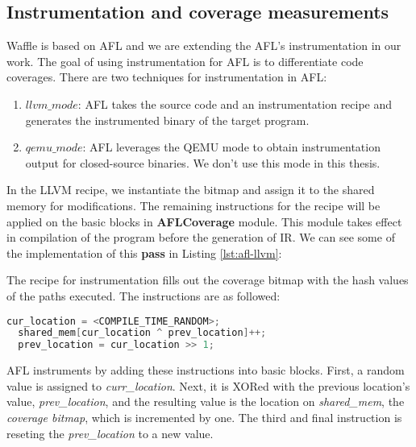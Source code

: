 \subsection{Instrumentation and coverage measurements}
\label{instrumentation}

Waffle is based on AFL and we are extending the AFL's instrumentation in our work. The goal of using instrumentation for AFL is to differentiate code coverages. There are two techniques for instrumentation in AFL:

\begin{enumerate}
  \item \textit{$llvm\_mode$}: AFL takes the source code and an instrumentation recipe and generates the instrumented binary of the target program.
  \item \textit{$qemu\_mode$}: AFL leverages the QEMU mode to obtain instrumentation output for closed-source binaries. We don't use this mode in this thesis.
\end{enumerate}

In the LLVM recipe, we instantiate the bitmap and assign it to the shared memory for modifications. The remaining instructions for the recipe will be applied on the basic blocks in \textbf{AFLCoverage} module. This module takes effect in compilation of the program before the generation of IR. We can see some of the implementation of this \textbf{pass} in Listing \ref{lst:afl-llvm}:



The recipe for instrumentation fills out the coverage bitmap with the hash values of the paths executed. The instructions are as followed:

\begin{lstlisting}[language=C++,style=CodeStyle,label={lst:hash},caption={Select element and update in shared\_mem}]
  cur_location = <COMPILE_TIME_RANDOM>;
  shared_mem[cur_location ^ prev_location]++; 
  prev_location = cur_location >> 1;
\end{lstlisting}

AFL instruments by adding these instructions into basic blocks. First, a random value is assigned to \textit{curr\_location}. Next, it is XORed with the previous location's value, \textit{prev\_location}, and the resulting value is the location on \textit{shared\_mem}, the \textit{coverage bitmap}, which is incremented by one. The third and final instruction is reseting the \textit{prev\_location} to a new value.

